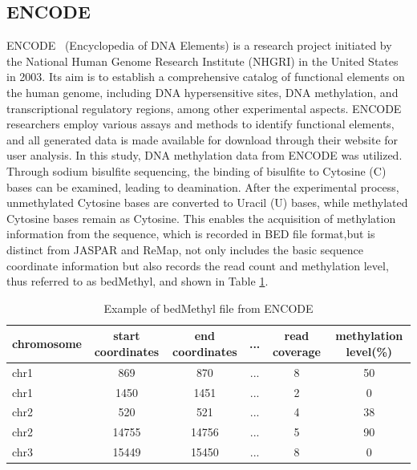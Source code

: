 \documentclass{PHlab-thesis}
\begin{document}
\subsection{ENCODE}
ENCODE~\cite{encode2012integrated} (Encyclopedia of DNA Elements) is a research project initiated by the National Human Genome Research Institute (NHGRI) in the United States in 2003. Its aim is to establish a comprehensive catalog of functional elements on the human genome, including DNA hypersensitive sites, DNA methylation, and transcriptional regulatory regions, among other experimental aspects. ENCODE researchers employ various assays and methods to identify functional elements, and all generated data is made available for download through their website for user analysis. In this study, DNA methylation data from ENCODE was utilized. Through sodium bisulfite sequencing, the binding of bisulfite to Cytosine (C) bases can be examined, leading to deamination. After the experimental process, unmethylated Cytosine bases are converted to Uracil (U) bases, while methylated Cytosine bases remain as Cytosine. This enables the acquisition of methylation information from the sequence, which is recorded in BED file format,but is distinct from JASPAR and ReMap, not only includes the basic sequence coordinate information but also records the read count and methylation level, thus referred to as bedMethyl, and shown in Table \ref*{table:bedMethyl}.
\begin{table}[H]
	\centering
	\begin{tabular}{l*{5}{c}}
		chromosome         & start coordinates &  end coordinates&...  & read coverage & methylation level(\%)\\
		\hline
		chr1 & 869 & 870 & ... & 8 & 50  \\
		chr1  & 1450 & 1451 & ... & 2 & 0  \\
		chr2   & 520 & 521 & ... & 4 & 38  \\
		chr2   & 14755 & 14756 & ... & 5 & 90  \\
		chr3   & 15449 & 15450 & ... & 8 & 0  \\
		\hline
	\end{tabular}
	\caption{Example of bedMethyl file from ENCODE}
	\label{table:bedMethyl}
\end{table}
\end{document}
